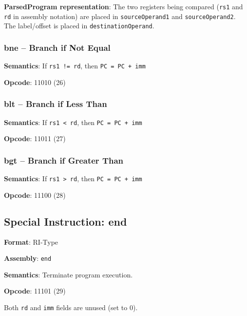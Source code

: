 \documentclass[12pt,a4paper]{article}
\begin{document}
\textbf{ParsedProgram representation}: The two registers being compared (\texttt{rs1} and \texttt{rd} in assembly notation) are placed in \texttt{sourceOperand1} and \texttt{sourceOperand2}. The label/offset is placed in \texttt{destinationOperand}.

\subsubsection{bne -- Branch if Not Equal}

\begin{tcolorbox}[colback=red!5, colframe=red!50!black]
\textbf{Semantics}: If \texttt{rs1 != rd}, then \texttt{PC = PC + imm}

\textbf{Opcode}: 11010 (26)
\end{tcolorbox}

\subsubsection{blt -- Branch if Less Than}

\begin{tcolorbox}[colback=red!5, colframe=red!50!black]
\textbf{Semantics}: If \texttt{rs1 < rd}, then \texttt{PC = PC + imm}

\textbf{Opcode}: 11011 (27)
\end{tcolorbox}

\subsubsection{bgt -- Branch if Greater Than}

\begin{tcolorbox}[colback=red!5, colframe=red!50!black]
\textbf{Semantics}: If \texttt{rs1 > rd}, then \texttt{PC = PC + imm}

\textbf{Opcode}: 11100 (28)
\end{tcolorbox}

\subsection{Special Instruction: end}

\begin{tcolorbox}[colback=gray!10, colframe=gray!50!black]
\textbf{Format}: RI-Type

\textbf{Assembly}: \texttt{end}

\textbf{Semantics}: Terminate program execution.

\textbf{Opcode}: 11101 (29)

Both \texttt{rd} and \texttt{imm} fields are unused (set to 0).
\end{tcolorbox}
\end{document}
